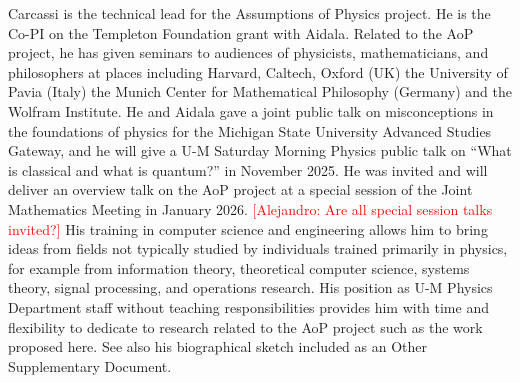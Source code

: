 Carcassi is the technical lead for the Assumptions of Physics project.  He is the Co-PI on the Templeton Foundation grant with Aidala.  Related to the AoP project, he has given seminars to audiences of physicists, mathematicians, and philosophers at places including Harvard, Caltech, Oxford (UK) the University of Pavia (Italy) the Munich Center for Mathematical Philosophy (Germany) and the Wolfram Institute.  He and Aidala gave a joint public talk on misconceptions in the foundations of physics for the Michigan State University Advanced Studies Gateway, and he will give a U-M Saturday Morning Physics public talk on ``What is classical and what is quantum?'' in November 2025.  He was invited and will deliver an overview talk on the AoP project at a special session of the Joint Mathematics Meeting in January 2026.  \textcolor{red}{[Alejandro: Are all special session talks invited?]} His training in computer science and engineering allows him to bring ideas from fields not typically studied by individuals trained primarily in physics, for example from information theory, theoretical computer science, systems theory, signal processing, and operations research.  His position as U-M Physics Department staff without teaching responsibilities provides him with time and flexibility to dedicate to research related to the AoP project such as the work proposed here. See also his biographical sketch included as an Other Supplementary Document.\\

